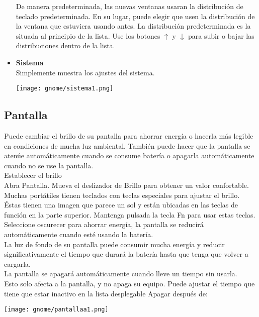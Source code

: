 \documentclass[12pt,letterpaper]{book}
\begin{document}
\begin{itemize}
De manera predeterminada, las nuevas ventanas usaran la distribución de teclado predeterminada. En su lugar, puede elegir que usen la distribución de la ventana que estuviera usando antes. La distribución predeterminada es la situada al principio de la lista. Use los botones $\uparrow$ y $\downarrow$ para subir o bajar las distribuciones dentro de la lista.
	\item {\large \bf Sistema}\\
	Simplemente muestra los ajustes del sistema.	
	\begin{center}
		\texttt{[image: gnome/sistema1.png]} 
    \end{center}
\end{itemize}
\subsection{Pantalla}
Puede cambiar el brillo de su pantalla para ahorrar energía o hacerla más legible en condiciones de mucha luz ambiental. También puede hacer que la pantalla se atenúe automáticamente cuando se consume batería o apagarla automáticamente cuando no se use la pantalla.\\

Establecer el brillo\\

Abra Pantalla.
Mueva el deslizador de Brillo para obtener un valor confortable.\\

Muchas portátiles tienen teclados con teclas especiales para ajustar el brillo. Éstas tienen una imagen que parece un sol y están ubicadas en las teclas de función en la parte superior. Mantenga pulsada la tecla Fn para usar estas teclas.\\

Seleccione oscurecer para ahorrar energía, la pantalla se reducirá  automáticamente cuando esté usando la batería.\\
La luz de fondo de su pantalla puede consumir mucha energía y reducir significativamente el tiempo que durará la batería hasta que tenga que volver a cargarla.\\
La pantalla se apagará automáticamente cuando lleve un tiempo sin usarla.\\
Esto solo afecta a la pantalla, y no apaga su equipo. Puede ajustar el tiempo que tiene que estar inactivo en la lista desplegable Apagar después de:
\begin{center}
\texttt{[image: gnome/pantallaa1.png]} 
\end{center}
\end{document}
